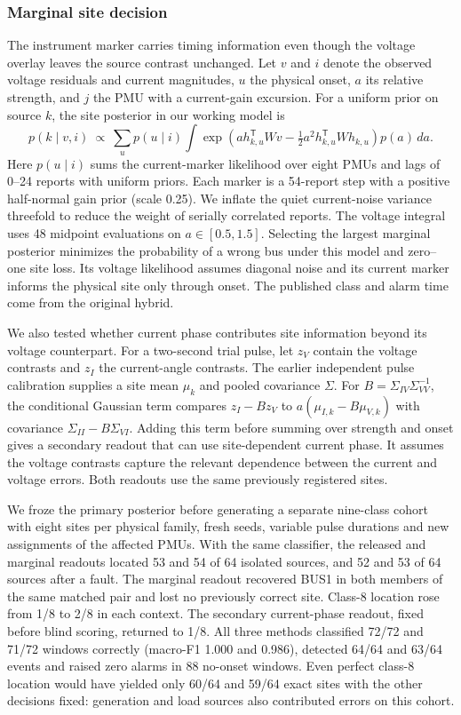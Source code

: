 \subsubsection{Marginal site decision}
The instrument marker carries timing information even though the
voltage overlay leaves the source contrast unchanged. Let $v$ and $i$
denote the observed voltage residuals and current magnitudes, $u$ the
physical onset, $a$ its relative strength, and $j$ the PMU with a
current-gain excursion. For a uniform prior on source $k$, the site
posterior in our working model is
\begin{equation}
 p(k\mid v,i)\ \propto\
 \sum_u p(u\mid i)\int
    \exp\!\left(a h_{k,u}^{\mathsf T}Wv-
    \tfrac12 a^2 h_{k,u}^{\mathsf T}Wh_{k,u}\right)p(a)\, da .
\end{equation}
Here $p(u\mid i)$ sums the current-marker likelihood over eight PMUs
and lags of 0--24 reports with uniform priors. Each marker is a 54-report
step with a positive half-normal gain prior (scale 0.25). We inflate the
quiet current-noise variance threefold to reduce the weight of serially
correlated reports. The voltage integral uses 48 midpoint evaluations
on $a\in[0.5,1.5]$. Selecting the largest marginal posterior minimizes
the probability of a wrong bus under this model and zero--one site
loss. Its voltage likelihood assumes diagonal noise and its current
marker informs the physical site only through onset. The published
class and alarm time come from the original hybrid.

We also tested whether current phase contributes site information
beyond its voltage counterpart. For a two-second trial pulse, let
$z_V$ contain the voltage contrasts and $z_I$ the current-angle
contrasts. The earlier independent pulse calibration supplies a
site mean $\mu_k$ and pooled covariance $\Sigma$. For
$B=\Sigma_{IV}\Sigma_{VV}^{-1}$, the conditional Gaussian term
compares $z_I-Bz_V$ to $a(\mu_{I,k}-B\mu_{V,k})$ with covariance
$\Sigma_{II}-B\Sigma_{VI}$. Adding this term before summing over
strength and onset gives a secondary readout that can use
site-dependent current phase. It assumes the voltage contrasts
capture the relevant dependence between the current and voltage
errors. Both readouts use the same previously registered sites.

We froze the primary posterior before generating a separate nine-class
cohort with eight sites per physical family, fresh seeds, variable
pulse durations and new assignments of the affected PMUs. With the
same classifier, the released and marginal readouts located 53 and
54 of 64 isolated sources, and 52 and 53 of 64 sources after a fault.
The marginal readout recovered BUS1 in both members of the same
matched pair and lost no previously correct site. Class-8 location
rose from 1/8 to 2/8 in each context. The secondary current-phase
readout, fixed before blind scoring, returned to 1/8. All three
methods classified 72/72 and 71/72 windows correctly (macro-F1
1.000 and 0.986), detected 64/64 and 63/64 events and raised zero
alarms in 88 no-onset windows. Even perfect class-8 location would
have yielded only 60/64 and 59/64 exact sites with the other decisions
fixed: generation and load sources also contributed errors on this
cohort.

